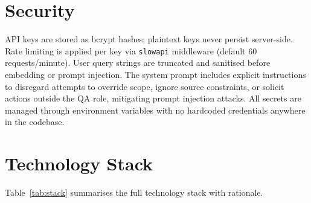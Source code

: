 \documentclass[10pt,a4paper,twocolumn]{article}
\begin{document}
\section{Security}

API keys are stored as bcrypt hashes; plaintext keys never persist server-side. Rate
limiting is applied per key via \texttt{slowapi} middleware (default 60 requests/minute).
User query strings are truncated and sanitised before embedding or prompt injection.
The system prompt includes explicit instructions to disregard attempts to override scope,
ignore source constraints, or solicit actions outside the QA role, mitigating
prompt injection attacks. All secrets are managed through environment variables with no
hardcoded credentials anywhere in the codebase.

\section{Technology Stack}

Table~\ref{tab:stack} summarises the full technology stack with rationale.
\end{document}
